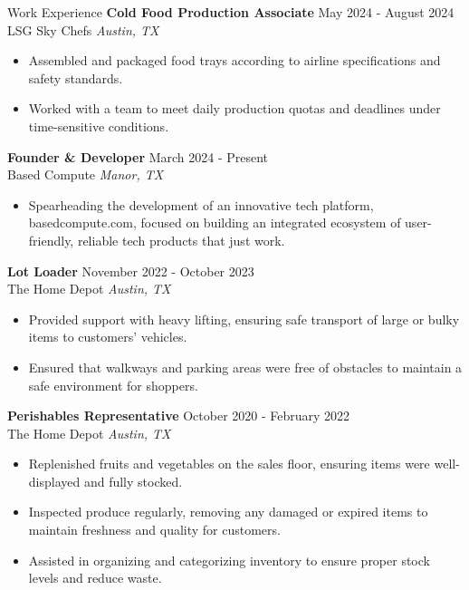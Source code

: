 \documentclass{resume} %
\begin{document}
    \begin{rSection}{Work Experience}
        \textbf{Cold Food Production Associate} \hfill May 2024 - August 2024 \\
        LSG Sky Chefs \hfill \textit{Austin, TX}
            \begin{itemize}
                \itemsep -3pt {} 
                \item Assembled and packaged food trays according to airline specifications and safety standards.
                \item Worked with a team to meet daily production quotas and deadlines under time-sensitive conditions.
            \end{itemize}

        \textbf{Founder \& Developer} \hfill March 2024 - Present \\
        Based Compute \hfill \textit{Manor, TX}
            \begin{itemize}
                \itemsep -3pt {} 
                \item Spearheading the development of an innovative tech platform, basedcompute.com, focused on building an integrated ecosystem of user-friendly, reliable tech products that just work.
            \end{itemize}

        \textbf{Lot Loader} \hfill November 2022 - October 2023 \\
        The Home Depot \hfill \textit{Austin, TX}
            \begin{itemize}
                \itemsep -3pt {} 
                \item Provided support with heavy lifting, ensuring safe transport of large or bulky items to customers' vehicles.
                \item Ensured that walkways and parking areas were free of obstacles to maintain a safe environment for shoppers.
            \end{itemize}

        \textbf{Perishables Representative} \hfill October 2020 - February 2022 \\
        The Home Depot \hfill \textit{Austin, TX}
            \begin{itemize}
                \itemsep -3pt {} 
                \item Replenished fruits and vegetables on the sales floor, ensuring items were well-displayed and fully stocked.
                \item Inspected produce regularly, removing any damaged or expired items to maintain freshness and quality for customers.
                \item Assisted in organizing and categorizing inventory to ensure proper stock levels and reduce waste.
            \end{itemize}
    \end{rSection} 
\end{document}
